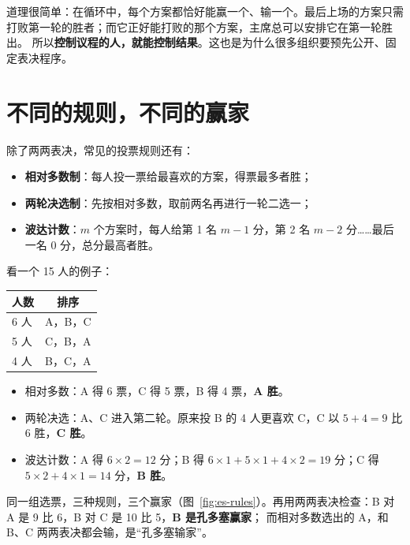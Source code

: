 道理很简单：在循环中，每个方案都恰好能赢一个、输一个。最后上场的方案只需打败第一轮的胜者；而它正好能打败的那个方案，主席总可以安排它在第一轮胜出。
所以\textbf{控制议程的人，就能控制结果}。这也是为什么很多组织要预先公开、固定表决程序。

\section{不同的规则，不同的赢家}

除了两两表决，常见的投票规则还有：
\begin{itemize}
  \item \textbf{相对多数制}：每人投一票给最喜欢的方案，得票最多者胜；
  \item \textbf{两轮决选制}：先按相对多数，取前两名再进行一轮二选一；
  \item \textbf{波达计数}：$m$ 个方案时，每人给第 1 名 $m-1$ 分，第 2 名 $m-2$ 分……最后一名 0 分，总分最高者胜。
\end{itemize}

看一个 15 人的例子：
\begin{center}
\small
\begin{tabular}{lc}
  \toprule
  人数 & 排序 \\
  \midrule
  6 人 & A，B，C \\
  5 人 & C，B，A \\
  4 人 & B，C，A \\
  \bottomrule
\end{tabular}
\end{center}
\begin{itemize}
  \item 相对多数：A 得 6 票，C 得 5 票，B 得 4 票，\textbf{A 胜}。
  \item 两轮决选：A、C 进入第二轮。原来投 B 的 4 人更喜欢 C，C 以 $5+4=9$ 比 6 胜，\textbf{C 胜}。
  \item 波达计数：A 得 $6\times2=12$ 分；B 得 $6\times1+5\times1+4\times2=19$ 分；C 得 $5\times2+4\times1=14$ 分，\textbf{B 胜}。
\end{itemize}
同一组选票，三种规则，三个赢家（图~\ref{fig:es-rules}）。再用两两表决检查：B 对 A 是 9 比 6，B 对 C 是 10 比 5，\textbf{B 是孔多塞赢家}；
而相对多数选出的 A，和 B、C 两两表决都会输，是“孔多塞输家”。

